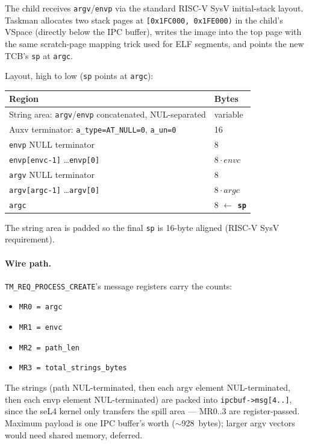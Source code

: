 The child receives \texttt{argv}/\texttt{envp} via the standard
RISC-V SysV initial-stack layout.  Taskman allocates two stack pages
at \texttt{[0x1FC000, 0x1FE000)} in the child's VSpace (directly below
the IPC buffer), writes the image into the top page with the same
scratch-page mapping trick used for ELF segments, and points the new
TCB's \texttt{sp} at \texttt{argc}.

Layout, high to low (\texttt{sp} points at \texttt{argc}):

\begin{center}
\begin{tabular}{ll}
\hline
Region                                   & Bytes \\
\hline
String area: \texttt{argv}/\texttt{envp} concatenated, NUL-separated & variable \\
Auxv terminator: \texttt{a\_type=AT\_NULL=0}, \texttt{a\_un=0}
                                         & 16 \\
\texttt{envp} NULL terminator            & 8 \\
\texttt{envp[envc-1]} \ldots \texttt{envp[0]}
                                         & $8 \cdot envc$ \\
\texttt{argv} NULL terminator            & 8 \\
\texttt{argv[argc-1]} \ldots \texttt{argv[0]}
                                         & $8 \cdot argc$ \\
\texttt{argc}                            & 8 \quad\textbf{$\leftarrow$ \texttt{sp}} \\
\hline
\end{tabular}
\end{center}

The string area is padded so the final \texttt{sp} is 16-byte aligned
(RISC-V SysV requirement).

\paragraph{Wire path.} \texttt{TM\_REQ\_PROCESS\_CREATE}'s message
registers carry the counts:
\begin{itemize}
    \item \texttt{MR0 = argc}
    \item \texttt{MR1 = envc}
    \item \texttt{MR2 = path\_len}
    \item \texttt{MR3 = total\_strings\_bytes}
\end{itemize}
The strings (path NUL-terminated, then each argv element NUL-terminated,
then each envp element NUL-terminated) are packed into
\texttt{ipcbuf->msg[4..]}, since the seL4 kernel only transfers the
spill area --- MR0..3 are register-passed.  Maximum payload is one
IPC buffer's worth ($\sim$928~bytes); larger argv vectors would need
shared memory, deferred.

